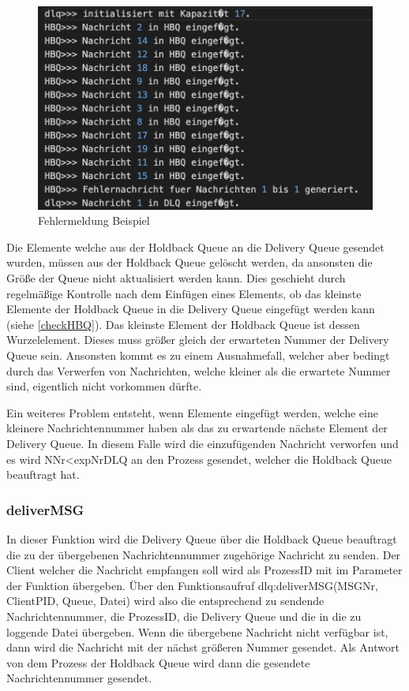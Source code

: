 \begin{figure}[htbp]
\begin{center}
\includegraphics[scale=0.6]{Bilder/BeispielHBQFehler}
\caption{\label{fig:BeispielHBQFehler} Fehlermeldung Beispiel \cite{HBQfehler}} 
\end{center}
\end{figure}

Die Elemente welche aus der Holdback Queue an die Delivery Queue gesendet wurden, müssen aus der Holdback Queue gelöscht werden, da ansonsten die Größe der Queue nicht aktualisiert werden kann. 
Dies geschieht durch regelmäßige Kontrolle nach dem Einfügen eines Elements, ob das kleinste Elemente der Holdback Queue in die Delivery Queue eingefügt werden kann (siehe \ref{checkHBQ}).
Das kleinste Element der Holdback Queue ist dessen Wurzelelement. Dieses muss größer gleich der erwarteten Nummer der Delivery Queue sein. 
Ansonsten kommt es zu einem Ausnahmefall, welcher aber bedingt durch das Verwerfen von Nachrichten, welche kleiner als die erwartete Nummer sind, eigentlich nicht vorkommen dürfte. 

Ein weiteres Problem entsteht, wenn Elemente eingefügt werden, welche eine kleinere Nachrichtennummer haben als das zu erwartende nächste Element der Delivery Queue. In diesem Falle wird die einzufügenden Nachricht verworfen und es wird NNr<expNrDLQ an den Prozess gesendet, welcher die Holdback Queue beauftragt hat.

\subsubsection{deliverMSG}

In dieser Funktion wird die Delivery Queue über die Holdback Queue beauftragt die zu der übergebenen Nachrichtennummer zugehörige Nachricht zu senden. Der Client welcher die Nachricht empfangen soll wird als ProzessID mit im Parameter der Funktion übergeben. 
Über den Funktionsaufruf dlq:deliverMSG(MSGNr, ClientPID, Queue, Datei) wird also die entsprechend zu sendende Nachrichtennummer, die ProzessID, die Delivery Queue und die in die zu loggende Datei übergeben. 
Wenn die übergebene Nachricht nicht verfügbar ist, dann wird die Nachricht mit der nächst größeren Nummer gesendet. 
Als Antwort von dem Prozess der Holdback Queue wird dann die gesendete Nachrichtennummer gesendet. 

